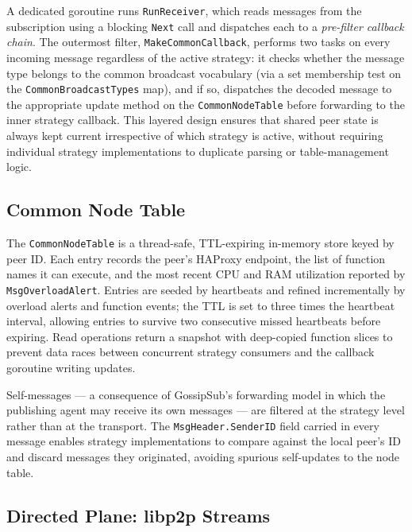 A dedicated goroutine runs \texttt{RunReceiver}, which reads messages from the
subscription using a blocking \texttt{Next} call and dispatches each to a
\emph{pre-filter callback chain}.
The outermost filter, \texttt{MakeCommonCallback}, performs two tasks on every
incoming message regardless of the active strategy: it checks whether the message
type belongs to the common broadcast vocabulary (via a set membership test on
the \texttt{CommonBroadcastTypes} map), and if so, dispatches the decoded message
to the appropriate update method on the \texttt{CommonNodeTable} before forwarding
to the inner strategy callback.
This layered design ensures that shared peer state is always kept current
irrespective of which strategy is active, without requiring individual strategy
implementations to duplicate parsing or table-management logic.

\subsection{Common Node Table}
\label{subsec:nodestbl}

The \texttt{CommonNodeTable} is a thread-safe, \ac{TTL}-expiring in-memory store
keyed by peer ID.
Each entry records the peer's \ac{HAProxy} endpoint, the list of function names
it can execute, and the most recent \ac{CPU} and \ac{RAM} utilization reported by
\texttt{MsgOverloadAlert}.
Entries are seeded by heartbeats and refined incrementally by overload alerts and
function events; the \ac{TTL} is set to three times the heartbeat interval,
allowing entries to survive two consecutive missed heartbeats before expiring.
Read operations return a snapshot with deep-copied function slices to prevent
data races between concurrent strategy consumers and the callback goroutine
writing updates.

Self-messages — a consequence of \ac{GossipSub}'s forwarding model in which
the publishing agent may receive its own messages — are filtered at the strategy
level rather than at the transport.
The \texttt{MsgHeader.SenderID} field carried in every message enables strategy
implementations to compare against the local peer's ID and discard messages they
originated, avoiding spurious self-updates to the node table.

\subsection{Directed Plane: libp2p Streams}
\label{subsec:directed}

